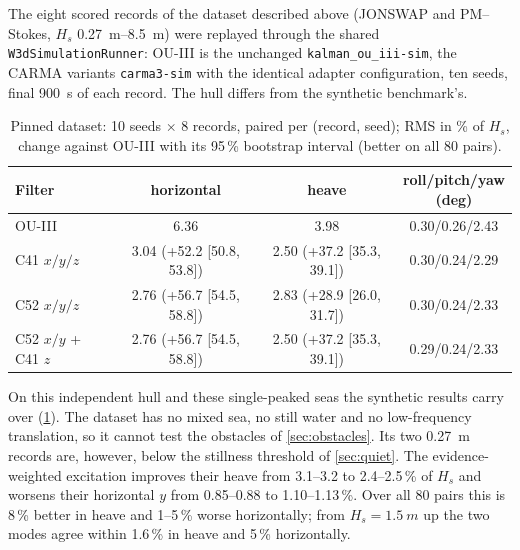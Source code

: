 \documentclass[conference]{IEEEtran}
\theoremstyle{bodysmall}
\begin{document}
\label{sec:dataset}
The eight scored records of the dataset described above (JONSWAP and
PM--Stokes, $H_s$ \SIrange{0.27}{8.5}{m}) were replayed through the shared
\texttt{W3dSimulationRunner}: OU-III is the unchanged
\texttt{kalman\_ou\_iii-sim}, the CARMA variants \texttt{carma3-sim} with the
identical adapter configuration, ten seeds, final \SI{900}{s} of each record.
The hull differs from the synthetic benchmark's.

\begin{table}[t]
\centering
\caption{Pinned dataset: 10 seeds $\times$ 8 records, paired per (record,
seed); RMS in \% of $H_s$, change against OU-III with its 95\,\% bootstrap
interval (better on all 80 pairs).}
\label{tab:dataset}
\footnotesize
\setlength{\tabcolsep}{2.5pt}
\begin{adjustbox}{max width=\columnwidth}
\begin{tabular}{@{}lccc@{}}
\toprule
Filter & horizontal & heave & \makecell{roll/pitch/yaw\\(deg)}\\
\midrule
OU-III & 6.36 & 3.98 & 0.30/0.26/2.43\\
C41 $x/y/z$ & 3.04 (+52.2 [50.8, 53.8]) & 2.50 (+37.2 [35.3, 39.1]) & 0.30/0.24/2.29\\
C52 $x/y/z$ & 2.76 (+56.7 [54.5, 58.8]) & 2.83 (+28.9 [26.0, 31.7]) & 0.30/0.24/2.33\\
C52 $x/y$ + C41 $z$ & 2.76 (+56.7 [54.5, 58.8]) & 2.50 (+37.2 [35.3, 39.1]) & 0.29/0.24/2.33\\
\bottomrule
\end{tabular}
\end{adjustbox}
\end{table}

On this independent hull and these single-peaked seas the synthetic results
carry over (\cref{tab:dataset}). The dataset has no mixed sea, no still
water and no low-frequency translation, so it cannot test the obstacles of
\cref{sec:obstacles}. Its two \SI{0.27}{m} records are, however, below the
stillness threshold of \cref{sec:quiet}. The evidence-weighted excitation
improves their heave from 3.1--3.2 to 2.4--2.5\,\% of $H_s$ and worsens their
horizontal $y$ from 0.85--0.88 to 1.10--1.13\,\%. Over all 80 pairs this is
8\,\% better in heave and 1--5\,\% worse horizontally; from
$H_s=\SI{1.5}{m}$ up the two modes agree within 1.6\,\% in heave and
5\,\% horizontally.


\end{document}
